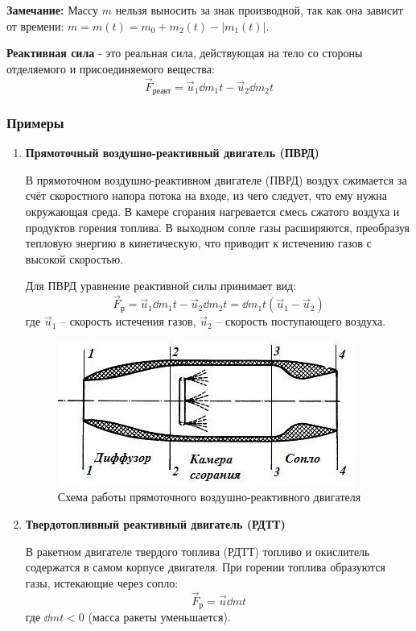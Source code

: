 \textbf{Замечание:} Массу $m$ нельзя выносить за знак производной, так как она зависит от времени: $m = m(t) = m_0 + m_2(t) - |m_1(t)|$.

\textbf{Реактивная сила} - это реальная сила, действующая на тело со стороны отделяемого и присоединяемого вещества:
\[ \vec{F}_{\text{реакт}} = \vec{u}_1 \dd{m_1}{t} - \vec{u}_2 \dd{m_2}{t} \]

\subsubsection*{Примеры}
\begin{enumerate}
	\item \textbf{Прямоточный воздушно-реактивный двигатель (ПВРД)}

	В прямоточном воздушно-реактивном двигателе (ПВРД) воздух сжимается за счёт скоростного напора потока на входе, из чего следует, что ему нужна окружающая среда. В камере сгорания нагревается смесь сжатого воздуха и продуктов горения топлива. В выходном сопле газы расширяются, преобразуя тепловую энергию в кинетическую, что приводит к истечению газов с высокой скоростью.

	Для ПВРД уравнение реактивной силы принимает вид:
	\[\vec{F}_\text{р} = \vec{u}_1 \dd{m_1}{t} - \vec{u}_2 \dd{m_2}{t} = \dd{m_1}{t}(\vec{u}_1 - \vec{u}_2)\]
	где $\vec{u}_1$ -- скорость истечения газов, $\vec{u}_2$ -- скорость поступающего воздуха.

	\begin{figure}[H]
		\centering
		\includegraphics[width=0.7\linewidth]{image/ПВРД}
		\caption{Схема работы прямоточного воздушно-реактивного двигателя}
		\label{fig:3}
	\end{figure}

	\item \textbf{Твердотопливный реактивный двигатель (РДТТ)}

	В ракетном двигателе твердого топлива (РДТТ) топливо и окислитель содержатся в самом корпусе двигателя. При горении топлива образуются газы, истекающие через сопло:
	\[ \vec{F}_\text{р} = \vec{u} \dd{m}{t} \]
	где $\dd{m}{t} < 0$ (масса ракеты уменьшается).


\end{enumerate}

